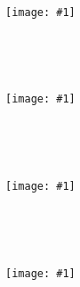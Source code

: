 \documentclass[12pt]{article}
\newcommand{\showplot}[1]{\mbox{ }

\vfill

\begin{center}
  \texttt{[image: \#1]}
\end{center}

\vfill

\mbox{ }

\pagebreak

}
\begin{document}
\showplot{lookcs_eastwest1.eps}
\showplot{lookcs_eastwest2.eps}
\showplot{lookcs_eastwest3.eps}
\showplot{lookcs_eastwest4.eps}
\end{document}
